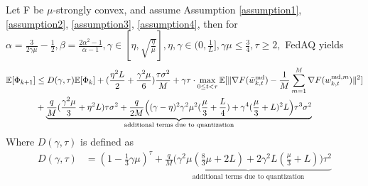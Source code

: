 
\begin{lemma} \label{lemmaD.1}
 Let F be $\mu$-strongly convex, and assume Assumption \ref{assumption1}, \ref{assumption2}, \ref{assumption3}, \ref{assumption4}, then for $\alpha=\frac{3}{2\gamma\mu} - \frac{1}{2}, \beta=\frac{2\alpha^2-1}{\alpha-1}, \gamma \in [\eta, \sqrt{\frac{\eta}{\mu}}], \eta, \gamma \in (0, \frac{1}{L}], \gamma\mu \leq \frac{3}{4},\tau \geq 2, $ FedAQ yields
 \begin{align*}
     \mathbb{E}[\Phi_{k+1}] &\leq D(\gamma, \tau) \mathbb{E}[\Phi_k] + (\frac{\eta^2 L}{2} + \frac{\gamma^2\mu}{6})\frac{\tau\sigma^2}{M} + \gamma\tau \cdot \max_{0\leq t <\tau} \mathbb{E}[\|\nabla F(\Bar{w}_{k, t}^{\textrm{md}})- \frac{1}{M} \sum_{m=1}^M \nabla F(w_{k, t}^{\textrm{md}, m})\|^2]\\
     &+ \underbrace{\frac{q}{M}(\frac{\gamma^2\mu}{3}+\eta^2 L)\tau\sigma^2 + \frac{q}{2M}\Big( (\gamma-\eta)^2 \gamma^2\mu^2 (\frac{\mu}{3} + \frac{L}{4}) + \gamma^4 (\frac{\mu}{3} + L)^2 L \Big)\tau^3\sigma^2}_{\textrm{additional terms due to quantization}}
 \end{align*}
 Where $D(\gamma, \tau)$ is defined as
 \begin{align*}
     D(\gamma, \tau) &= (1-\frac{1}{3}\gamma\mu)^\tau + \underbrace{\frac{q}{M}\Big( \gamma^2\mu(\frac{8}{3}\mu + 2L) + 2\gamma^2 L(\frac{\mu}{3} + L)\Big)\tau^2}_{\textrm{additional terms due to quantization}}
 \end{align*}
\end{lemma}


